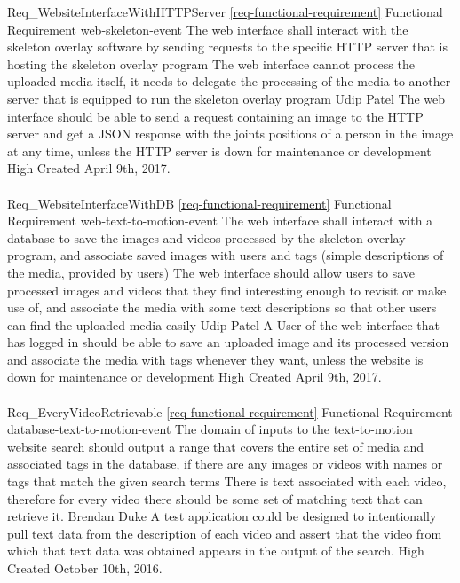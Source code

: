 \documentclass{scrreprt}
\begin{document}
\requirement
{Req_WebsiteInterfaceWithHTTPServer}
{\ref{req-functional-requirement} Functional Requirement}
{web-skeleton-event}
{The web interface shall interact with the skeleton overlay software by sending requests to the specific HTTP server that is hosting the skeleton overlay program}
{The web interface cannot process the uploaded media itself, it needs to delegate the processing of the media to another server that is equipped to run the skeleton overlay program}
{Udip Patel}
{The web interface should be able to send a request containing an image to the HTTP server and get a JSON response with the joints positions of a person in the image at any time, unless the HTTP server is down for maintenance or development }
{High}
{Created April 9th, 2017.}
\\ \\

\requirement
{Req_WebsiteInterfaceWithDB}
{\ref{req-functional-requirement} Functional Requirement}
{web-text-to-motion-event}
{The web interface shall interact with a database to save the images and videos processed by the skeleton overlay program, and associate saved images with users and tags (simple descriptions of the media, provided by users) }
{The web interface should allow users to save processed images and videos that they find interesting enough to revisit or make use of, and associate the media with some text descriptions so that other users can find the uploaded media easily}
{Udip Patel}
{A User of the web interface that has logged in should be able to save an uploaded image and its processed version and associate the media with tags whenever they want, unless the website is down for maintenance or development }
{High}
{Created April 9th, 2017.}
\\ \\

\requirement
{Req_EveryVideoRetrievable}
{\ref{req-functional-requirement} Functional Requirement}
{database-text-to-motion-event}
{The domain of inputs to the text-to-motion website search should output a
 range that covers the entire set of media and associated tags in the database, if there are any images or videos with names or tags that match the given search terms}
{There is text associated with each video, therefore for every video there
 should be some set of matching text that can retrieve it.}
{Brendan Duke}
{A test application could be designed to intentionally pull text data from the
 description of each video and assert that the video from which that text data
 was obtained appears in the output of the search.}
{High}
{Created October 10th, 2016.}
\\ \\
\end{document}
